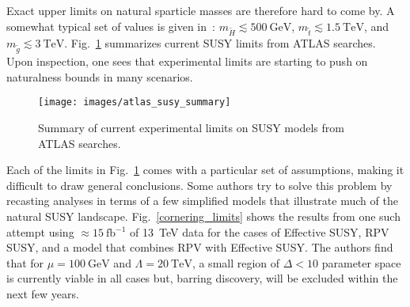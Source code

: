 \documentclass[12pt]{article}
\begin{document}
    Exact upper limits on natural sparticle masses are therefore hard to come by. A somewhat typical set of values is given in~\cite{drees_kim}: $m_{\tilde{H}} \lesssim \SI{500}{\giga\electronvolt}$, $m_{\tilde{t}} \lesssim \SI{1.5}{\tera\electronvolt}$, and $m_{\tilde{g}} \lesssim \SI{3}{\tera\electronvolt}$. Fig.~\ref{atlas_susy_summary} summarizes current SUSY limits from ATLAS searches. Upon inspection, one sees that experimental limits are starting to push on naturalness bounds in many scenarios.

    \noindent \begin{figure}[htbp] \begin{center}
    \texttt{[image: images/atlas\_susy\_summary]}
    \caption{Summary of current experimental limits on SUSY models from ATLAS searches.}
    \label{atlas_susy_summary}
    \end{center} \end{figure}

    Each of the limits in Fig.~\ref{atlas_susy_summary} comes with a particular set of assumptions, making it difficult to draw general conclusions. Some authors try to solve this problem by recasting analyses in terms of a few simplified models that illustrate much of the natural SUSY landscape. Fig.~\ref{cornering_limits} shows the results from one such attempt using $\approx \SI{15}{\femto\barn^{-1}}$ of \SI{13}{\tera\electronvolt} data for the cases of Effective SUSY, RPV SUSY, and a model that combines RPV with Effective SUSY. The authors find that for $\mu = \SI{100}{\giga\electronvolt}$ and $\Lambda = \SI{20}{\tera\electronvolt}$, a small region of $\Delta < 10$ parameter space is currently viable in all cases but, barring discovery, will be excluded within the next few years.
    
\end{document}
